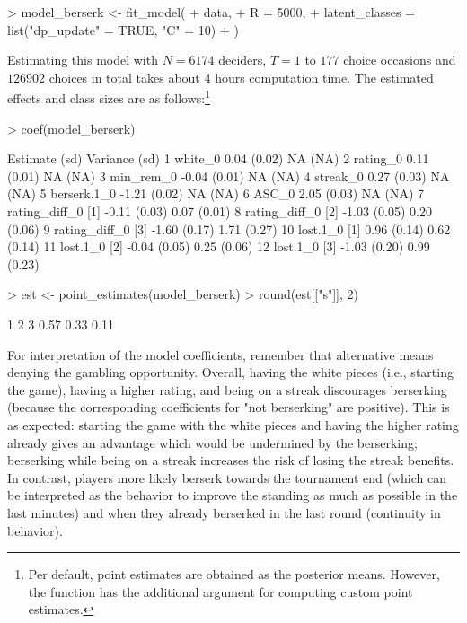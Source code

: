 \documentclass[article,shortnames]{jss}
\newcommand{\fct}[1]{\code{#1()}}
\begin{document}
\begin{Schunk}
\begin{Sinput}
> model_berserk <- fit_model(
+    data,
+    R = 5000,
+    latent_classes = list("dp_update" = TRUE, "C" = 10)
+  )
\end{Sinput}
\end{Schunk}


Estimating this model with $N = 6174$ deciders, $T = 1$ to $177$ choice occasions and $126902$ choices in total takes about 4 hours computation time. The estimated effects and class sizes are as follows:\footnote{Per default, point estimates are obtained as the posterior means. However, the \fct{point\_estimates} function has the additional  argument for computing custom point estimates.}

\begin{Schunk}
\begin{Sinput}
> coef(model_berserk)
\end{Sinput}
\begin{Soutput}
                     Estimate   (sd) Variance   (sd)
1           white_0      0.04 (0.02)       NA   (NA)
2          rating_0      0.11 (0.01)       NA   (NA)
3         min_rem_0     -0.04 (0.01)       NA   (NA)
4          streak_0      0.27 (0.03)       NA   (NA)
5       berserk.1_0     -1.21 (0.02)       NA   (NA)
6             ASC_0      2.05 (0.03)       NA   (NA)
7  rating_diff_0 [1]    -0.11 (0.03)     0.07 (0.01)
8  rating_diff_0 [2]    -1.03 (0.05)     0.20 (0.06)
9  rating_diff_0 [3]    -1.60 (0.17)     1.71 (0.27)
10      lost.1_0 [1]     0.96 (0.14)     0.62 (0.14)
11      lost.1_0 [2]    -0.04 (0.05)     0.25 (0.06)
12      lost.1_0 [3]    -1.03 (0.20)     0.99 (0.23)
\end{Soutput}
\begin{Sinput}
> est <- point_estimates(model_berserk)
> round(est[["s"]], 2)
\end{Sinput}
\begin{Soutput}
   1    2    3 
0.57 0.33 0.11 
\end{Soutput}
\end{Schunk}

For interpretation of the model coefficients, remember that alternative  means denying the gambling opportunity. Overall, having the white pieces (i.e., starting the game), having a higher rating, and being on a streak discourages berserking (because the corresponding coefficients for "not berserking" are positive). This is as expected: starting the game with the white pieces and having the higher rating already gives an advantage which would be undermined by the berserking; berserking while being on a streak increases the risk of losing the streak benefits. In contrast, players more likely berserk towards the tournament end (which can be interpreted as the behavior to improve the standing as much as possible in the last minutes) and when they already berserked in the last round (continuity in behavior).
\end{document}
